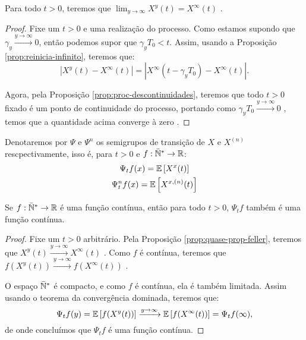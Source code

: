 \begin{proposicao}
  \label{prop:quase-prop-feller}
  Para todo $t > 0$, teremos que $\lim_{y \to \infty} X^y(t) =
  X^\infty(t)$  \qc.
\end{proposicao}
\begin{proof}
  Fixe um $t > 0$ e uma realização do processo. Como estamos supondo
  que $\gamma_y \xrightarrow{y\to\infty} 0$, então podemos supor que
  $\gamma_y T_0 < t$. Assim, usando a Proposição
  \ref{prop:reinicia-infinito}, teremos que:
  \begin{displaymath}
    |X^y(t) - X^\infty(t)| = |X^\infty(t-\gamma_yT_0) - X^\infty(t)|.
  \end{displaymath}

  Agora, pela Proposição \ref{prop:proc-descontinuidades}, teremos que
  todo $t > 0$ fixado é \qc um ponto de continuidade do processo,
  portando como $\gamma_y T_0 \xrightarrow{y \to \infty} 0$ \qc, temos
  que a quantidade acima converge à zero \qc. 
\end{proof}



\begin{definicao}
  \label{def:semigrupo}
  Denotaremos por $\Psi$ e $\Psi^n$ os semigrupos de transição de $X$
  e $X^{(n)}$ rescpectivamente, isso é, para $t > 0$ e $f: {\mathbb{\bar{N}^*}} \to
  {\mathbb{R}}$:
  \begin{gather*}
    \Psi_t f (x) = {\mathbb{E}} \left[ X^x(t) \right]\\
    \Psi^n_t f (x) = {\mathbb{E}} \left[ X^{x, (n)}(t) \right]
  \end{gather*}
\end{definicao}

\begin{proposicao}
  \label{prop:proriedade-feller}
  Se $f: {\mathbb{\bar{N}^*}} \to {\mathbb{R}}$ é uma função contínua, então para todo $t > 0$,
  $\Psi_t f$ também é uma função contínua.
\end{proposicao}
\begin{proof}
  Fixe um $t > 0$ arbitrário. Pela Proposição
  \ref{prop:quase-prop-feller}, teremos que $X^y(t)
  \xrightarrow{y\to\infty} X^\infty(t)$ \qc. Como $f$ é contínua,
  teremos que $f(X^y(t)) \xrightarrow{y\to\infty} f(X^\infty(t))$ \qc.

  O espaço ${\mathbb{\bar{N}^*}}$ é compacto, e como $f$ é contínua, ela é também
  limitada. Assim usando o teorema da convergência dominada, teremos
  que:
  \begin{displaymath}
    \Psi_t f (y) = {\mathbb{E}} \left[ f(X^y(t)) \right]
    \xrightarrow{y\to\infty}
    {\mathbb{E}} \left[ f(X^\infty(t)) \right] = \Psi_t f (\infty),
  \end{displaymath}
  de onde concluímos que $\Psi_t f$ é uma função contínua.
\end{proof}

